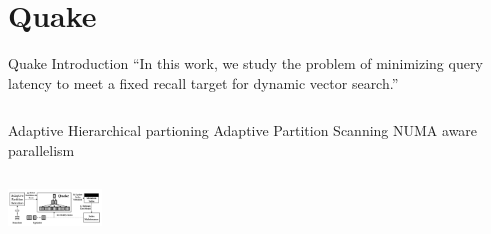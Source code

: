 \section{Quake}

\begin{frame}{Quake Introduction}
``In this work, we study the problem of minimizing query latency to meet a fixed recall target for dynamic vector search.''
\begin{columns}
\centering
\begin{outline}
  \1 Adaptive Hierarchical partioning
  \1 Adaptive Partition Scanning
  \1 NUMA aware parallelism
\end{outline}

\begin{center}
\centering

\end{center}
\end{columns}
\includegraphics[width=2.5cm]{assets/quake_arch.png}
\end{frame}
